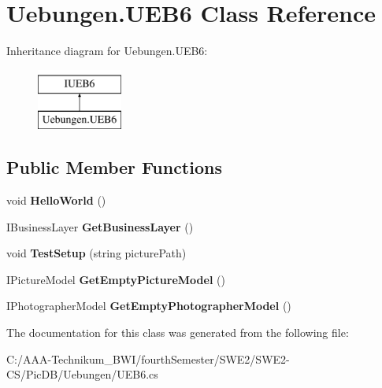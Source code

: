 \hypertarget{class_uebungen_1_1_u_e_b6}{}\section{Uebungen.\+U\+E\+B6 Class Reference}
\label{class_uebungen_1_1_u_e_b6}
Inheritance diagram for Uebungen.\+U\+E\+B6\+:\begin{figure}[H]
\begin{center}
\leavevmode
\includegraphics[height=2.000000cm]{class_uebungen_1_1_u_e_b6}
\end{center}
\end{figure}
\subsection*{Public Member Functions}
\begin{DoxyCompactItemize}
\item 
\mbox{\label{class_uebungen_1_1_u_e_b6_abf0ff20f53d95c37a800e4b7366b2527}} 
void {\bfseries Hello\+World} ()
\item 
\mbox{\label{class_uebungen_1_1_u_e_b6_abab344eb511f90b20a7b1b223cca8d30}} 
I\+Business\+Layer {\bfseries Get\+Business\+Layer} ()
\item 
\mbox{\label{class_uebungen_1_1_u_e_b6_a1b00f50273668a2c405844b202556ddf}} 
void {\bfseries Test\+Setup} (string picture\+Path)
\item 
\mbox{\label{class_uebungen_1_1_u_e_b6_aeff345add8087becd70681a3bdd82796}} 
I\+Picture\+Model {\bfseries Get\+Empty\+Picture\+Model} ()
\item 
\mbox{\label{class_uebungen_1_1_u_e_b6_a34e26039860646a389711d3c7cda98ae}} 
I\+Photographer\+Model {\bfseries Get\+Empty\+Photographer\+Model} ()
\end{DoxyCompactItemize}


The documentation for this class was generated from the following file\+:\begin{DoxyCompactItemize}
\item 
C\+:/\+A\+A\+A-\/\+Technikum\+\_\+\+B\+W\+I/fourth\+Semester/\+S\+W\+E2/\+S\+W\+E2-\/\+C\+S/\+Pic\+D\+B/\+Uebungen/U\+E\+B6.\+cs\end{DoxyCompactItemize}
